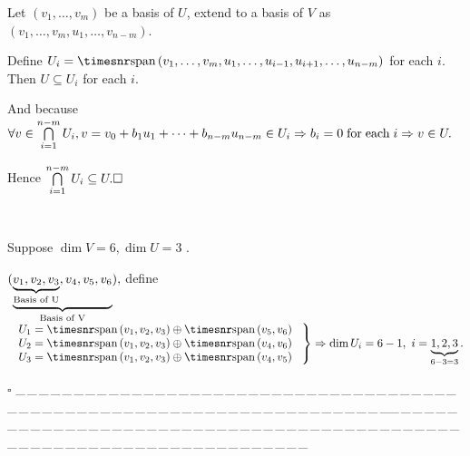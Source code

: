 \documentclass[a4paper, 11pt, UTF8]{article}
\def\Spn{{\timesnr\textup{span}}\,}
\def\ProblemEnding{{\tiny \_\,\_\,\_\,\_\,\_\,\_\,\_\,\_\,\_\,\_\,\_\,\_\,\_\,\_\,\_\,\_\,\_\,\_\,\_\,\_\,\_\,\_\,\_\,\_\,\_\,\_\,\_\,\_\,\_\,\_\,\_\,\_\,\_\,\_\,\_\,\_\,\_\,\_\,\_\,\_\,\_\,\_\,\_\,\_\,\_\,\_\,\_\,\_\,\_\,\_\,\_\,\_\,\_\,\_\,\_\,\_\,\_\,\_\,\_\,\_\,\_\,\_\,\_\,\_\,\_\,\_\,\_\,\_\,\_\,\_\,\_\_\,\_\,\_\,\_\,\_\,\_\,\_\,\_\,\_\,\_\,\_\,\_\,\_\,\_\,\_\,\_\,\_\,\_\,\_\,\_\,\_\,\_\,\_\,\_\,\_\,\_\,\_\,\_\,\_\,\_\,\_\,\_\,\_\,\_\,\_\,\_\,\_\,\_\,\_\,\_\,\_\,\_\,\_\,\_\,\_\,\_\,\_\,\_\,\_\,\_\,\_\,\_\,\_\,\_\,\_\,\_\,\_\,\_\,\_\,\_\,\_\,\_\,\_\,\_\,\_\,\_\,\_\,\_\,\_\,\_\,\_}}
\begin{document}
\begin{large}
\par\quad
Let $(v_1,\dots,v_m)$ be a basis of $U$, extend to a basis of $V$ as $(v_1,\dots,v_m,u_1,\dots,v_{n-m})$.\par\quad
Define $U_i=\Spn(v_1,\dots,v_m,u_1,\dots,u_{i-1},u_{i+1},\dots,u_{n-m})$ for each $i$. Then $U\subseteq U_i$ for each $i.$\vspace{4pt}\par\quad
\vspace{2pt}And because $\forall v\in \bigcap\limits_{i=1}^{n-m}U_i,v=v_0+b_1 u_1+\dots+b_{n-m} u_{n-m}\in U_i\Rightarrow b_i=0 \textup{\;for\;each\;} i\Rightarrow v\in U.$\par\quad
\vspace{8pt}Hence $\bigcap\limits_{i=1}^{n-m}U_i\subseteq U.\hfill\square$\par
\Example\,\,\, {\normalsize Suppose $\dim V=6,\dim U=3$ .\par\quad
$(\underbrace{\underbrace{v_1,v_2,v_3}_\textup{Basis of U},v_4,v_5,v_6}_\textup{Basis of V}),$ define $\MathRightBrace{l}{$
$U_1=\Spn(v_1,v_2,v_3)\oplus\Spn(v_5,v_6)\\ $
$U_2=\Spn(v_1,v_2,v_3)\oplus\Spn(v_4,v_6)\\ $
$U_3=\Spn(v_1,v_2,v_3)\oplus\Spn(v_4,v_5)$
$}\Rightarrow\dim U_i=6-1,\,\,i=\underbrace{1,2,3}_{6-3=3}.$}
\hfill {$\square$}\vspace{6pt}
\ProblemEnding\par


\end{large}
\end{document}
